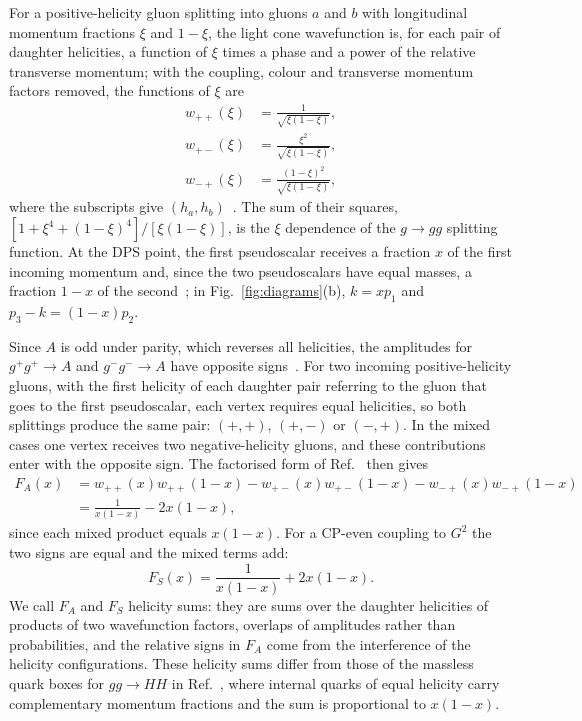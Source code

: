 For a positive-helicity gluon splitting into gluons $a$ and $b$ with
longitudinal momentum fractions $\xi$ and $1-\xi$, the light cone wavefunction is,
for each pair of daughter helicities, a function of $\xi$ times a phase and a power
of the relative transverse momentum; with the coupling, colour and transverse momentum
factors removed, the functions of $\xi$ are
\begin{align}
 w_{++}(\xi)&=\frac{1}{\sqrt{\xi(1-\xi)}},
 \nonumber\\
 w_{+-}(\xi)&=\frac{\xi^2}{\sqrt{\xi(1-\xi)}},
\nonumber\\
 w_{-+}(\xi)&=\frac{(1-\xi)^2}{\sqrt{\xi(1-\xi)}},
 \label{eq:splitting-weights}
\end{align}
where the subscripts give $(h_a,h_b)$~\cite{Mangano:1990by,Dixon:1996wi}.
The sum of their squares, $[1+\xi^4+(1-\xi)^4]/[\xi(1-\xi)]$, is the $\xi$
dependence of the $g\to gg$ splitting function. At the DPS point, the first
pseudoscalar receives a fraction $x$ of the first incoming momentum and,
since the two pseudoscalars have equal masses, a fraction $1-x$ of the
second~\cite{GauntStirling2011}; in Fig.~\ref{fig:diagrams}(b),
$k=xp_1$ and $p_3-k=(1-x)p_2$.

Since $A$ is odd under parity, which reverses all helicities, the
amplitudes for $g^+g^+\to A$ and $g^-g^-\to A$ have opposite
signs~\cite{Dixon:1996wi}. For two incoming positive-helicity gluons, with
the first helicity of each daughter pair referring to the gluon that goes
to the first pseudoscalar, each vertex requires equal helicities, so both
splittings produce the same pair: $(+,+)$, $(+,-)$ or $(-,+)$. In the mixed
cases one vertex receives two negative-helicity gluons, and these
contributions enter with the opposite sign. The factorised form of
Ref.~\cite{GauntStirling2011} then gives
\begin{align}
 F_A(x)
 &=w_{++}(x)w_{++}(1-x)
 -w_{+-}(x)w_{+-}(1-x)
       -w_{-+}(x)w_{-+}(1-x)
 \nonumber\\
 &=\frac{1}{x(1-x)}-2x(1-x),
 \label{eq:FA}
\end{align}
since each mixed product equals $x(1-x)$. For a CP-even coupling to $G^2$
the two signs are equal and the mixed terms add:
\begin{equation}
 F_S(x)=\frac{1}{x(1-x)}+2x(1-x).
 \label{eq:FS}
\end{equation}
We call $F_A$ and $F_S$ helicity sums: they are sums over the daughter helicities of
products of two wavefunction factors, overlaps of amplitudes rather than probabilities, and
the relative signs in $F_A$ come from the interference of the helicity configurations.
These helicity sums differ from those of the massless quark boxes for
$gg\to HH$ in Ref.~\cite{GauntStirling2011}, where internal quarks of equal
helicity carry complementary momentum fractions and the sum is
proportional to $x(1-x)$.


